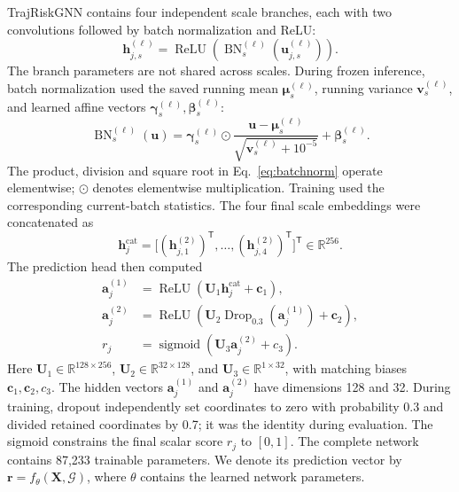 TrajRiskGNN contains four independent scale branches, each with two convolutions followed by batch normalization and ReLU:
\begin{equation}\label{eq:branch}
\boldsymbol h_{j,s}^{(\ell)}=
\operatorname{ReLU}\!\left(\operatorname{BN}_s^{(\ell)}
(\boldsymbol u_{j,s}^{(\ell)})\right).
\end{equation}
The branch parameters are not shared across scales. During frozen inference, batch normalization used the saved running mean \(\boldsymbol\mu_s^{(\ell)}\), running variance \(\boldsymbol v_s^{(\ell)}\), and learned affine vectors \(\boldsymbol\gamma_s^{(\ell)},\boldsymbol\beta_s^{(\ell)}\):
\begin{equation}\label{eq:batchnorm}
\operatorname{BN}_s^{(\ell)}(\boldsymbol u)=
\boldsymbol\gamma_s^{(\ell)}\odot
\frac{\boldsymbol u-\boldsymbol\mu_s^{(\ell)}}
{\sqrt{\boldsymbol v_s^{(\ell)}+10^{-5}}}
+\boldsymbol\beta_s^{(\ell)}.
\end{equation}
The product, division and square root in Eq.~\eqref{eq:batchnorm} operate elementwise; \(\odot\) denotes elementwise multiplication. Training used the corresponding current-batch statistics. The four final scale embeddings were concatenated as
\begin{equation}\label{eq:concatenation}
\boldsymbol h_j^{\mathrm{cat}}=
\big[(\boldsymbol h_{j,1}^{(2)})^{\mathsf T},\ldots,
(\boldsymbol h_{j,4}^{(2)})^{\mathsf T}\big]^{\mathsf T}
\in\mathbb R^{256}.
\end{equation}
The prediction head then computed
\begin{equation}\label{eq:head}
\begin{aligned}
\boldsymbol a_j^{(1)}&=\operatorname{ReLU}(\mathbf U_1\boldsymbol h_j^{\mathrm{cat}}+\boldsymbol c_1),\\
\boldsymbol a_j^{(2)}&=\operatorname{ReLU}\!\left(\mathbf U_2
\operatorname{Drop}_{0.3}(\boldsymbol a_j^{(1)})+\boldsymbol c_2\right),\\
r_j&=\operatorname{sigmoid}(\mathbf U_3\boldsymbol a_j^{(2)}+c_3).
\end{aligned}
\end{equation}
Here \(\mathbf U_1\in\mathbb R^{128\times256}\), \(\mathbf U_2\in\mathbb R^{32\times128}\), and \(\mathbf U_3\in\mathbb R^{1\times32}\), with matching biases \(\boldsymbol c_1,\boldsymbol c_2,c_3\). The hidden vectors \(\boldsymbol a_j^{(1)}\) and \(\boldsymbol a_j^{(2)}\) have dimensions 128 and 32. During training, dropout independently set coordinates to zero with probability 0.3 and divided retained coordinates by 0.7; it was the identity during evaluation. The sigmoid constrains the final scalar score \(r_j\) to \([0,1]\). The complete network contains 87,233 trainable parameters. We denote its prediction vector by \(\boldsymbol r=f_{\theta}(\mathbf X,\mathcal G)\), where \(\theta\) contains the learned network parameters.

